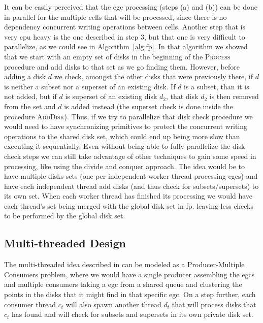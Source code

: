 It can be easily perceived that the \ac{egc} processing (steps (a) and (b)) can be done in parallel for the multiple
cells that will be processed, since there is no dependency concurrent writing operations between cells. Another step
that is very \ac{cpu} heavy is the one described in step 3, but that one is very difficult to parallelize, as we could
see in Algorithm~\ref{alg:fp}. In that algorithm we showed that we start with an empty set of disks in the beginning of
the \textsc{Process} procedure and add disks to that set as we go finding them. However, before adding a disk $d$ we
check, amongst the other disks that were previously there, if $d$ is neither a subset nor a superset of an existing
disk. If $d$ is a subset, than it is not added, but if $d$ is superset of an existing disk $d_2$, that disk $d_2$ is
then removed from the set and $d$ is added instead (the superset check is done inside the procedure \textsc{AddDisk}).
Thus, if we try to parallelize that disk check procedure we would need to have synchronizing primitives to protect the
concurrent writing operations to the shared disk set, which could end up being more slow than executing it sequentially.
Even without being able to fully parallelize the disk check steps we can still take advantage of other techniques to
gain some speed in processing, like using the divide and conquer approach. The idea would be to have multiple disks sets
(one per independent worker thread processing \ac{egc}s) and have each independent thread add disks (and thus check for
subsets/supersets) to its own set. When each worker thread has finished its processing we would have each thread's set
being merged with the global disk set in \ac{fp}. leaving less checks to be performed by the global disk set.

\subsection{Multi-threaded Design}
\label{subsec:multithread}
The multi-threaded idea described in  can be modeled as a Producer-Multiple Consumers problem,
where we would have a single producer assembling the \ac{egc}s and multiple consumers taking a \ac{egc} from a shared
queue and clustering the points in the disks that it might find in that specific \ac{egc}. On a step further, each
consumer thread $c_t$ will also spawn another thread $d_t$ that will process disks that $c_t$ has found and will check
for subsets and supersets in its own private disk set.

